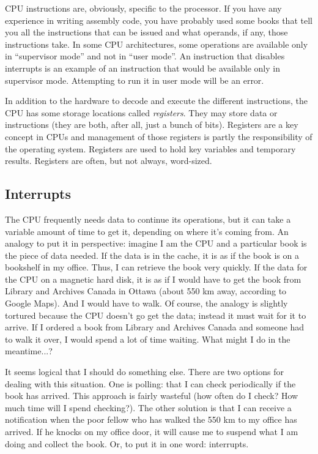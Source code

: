 CPU instructions are, obviously, specific to the processor. If you have any experience in writing assembly code, you have probably used some books that tell you all the instructions that can be issued and what operands, if any, those instructions take. In some CPU architectures, some operations are available only in ``supervisor mode'' and not in ``user mode''. An instruction that disables interrupts is an example of an instruction that would be available only in supervisor mode. Attempting to run it in user mode will be an error.

In addition to the hardware to decode and execute the different instructions, the CPU has some storage locations called \textit{registers}. They may store data or instructions (they are both, after all, just a bunch of bits). Registers are a key concept in CPUs and management of those registers is partly the responsibility of the operating system. Registers are used to hold key variables and temporary results. Registers are often, but not always, word-sized.


\subsection*{Interrupts}

The CPU frequently needs data to continue its operations, but it can take a variable amount of time to get it, depending on where it's coming from. An analogy to put it in perspective: imagine I am the CPU and a particular book is the piece of data needed. If the data is in the cache, it is as if the book is on a bookshelf in my office. Thus, I can retrieve the book very quickly. If the data for the CPU on a magnetic hard disk, it is as if I would have to get the book from Library and Archives Canada in Ottawa (about 550 km away, according to Google Maps). And I would have to walk. Of course, the analogy is slightly tortured because the CPU doesn't go get the data; instead it must wait for it to arrive. If I ordered a book from Library and Archives Canada and someone had to walk it over, I would spend a lot of time waiting. What might I do in the meantime...?

It seems logical that I should do something else. There are two options for dealing with this situation. One is polling: that I can check periodically if the book has arrived. This approach is fairly wasteful (how often do I check? How much time will I spend checking?). The other solution is that I can receive a notification when the poor fellow who has walked the 550 km to my office has arrived. If he knocks on my office door, it will cause me to suspend what I am doing and collect the book. Or, to put it in one word: interrupts.

